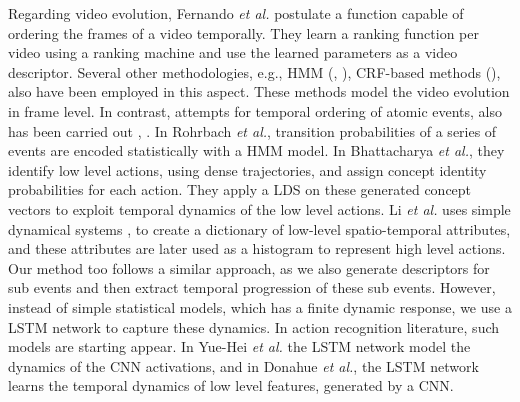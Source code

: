 Regarding video evolution, Fernando \textit{et al.}\cite{fernando2015modeling} postulate
a function capable of ordering the frames of a video
temporally. They learn a ranking function per video using a ranking machine and use the learned parameters as 
a video descriptor. Several other methodologies, e.g., HMM (\cite{wang2011hidden}, \cite{wu2014leveraging}), 
CRF-based methods (\cite{song2013action}), also have been employed in this aspect. These methods model the video evolution in frame 
level. In contrast, attempts for temporal ordering of atomic events, also has been carried out \cite{rohrbach2012script}, \cite{bhattacharya2014recognition}.
In Rohrbach \textit{et al.}\cite{rohrbach2012script}, transition probabilities of a series of events are encoded statistically with a HMM model. 
In Bhattacharya \textit{et al.}\cite{bhattacharya2014recognition}, they identify low level actions, using dense trajectories, and assign concept identity 
probabilities for each action. They apply a LDS on these generated concept vectors to exploit temporal 
dynamics of the low level actions. Li \textit{et al.}\cite{li2013recognizing} uses simple dynamical systems \cite{jackson1992perspectives},
\cite{kailath1974view} to create a dictionary of low-level spatio-temporal attributes, and these attributes 
are later used as a histogram to represent high level actions. Our method too follows a similar approach,
as we also generate descriptors for sub events and then extract temporal progression 
of these sub events. However, instead of simple statistical models, which has a finite dynamic response, 
we use a LSTM network \cite{hochreiter1997long} to capture these dynamics. In action recognition literature,
such models are starting appear. In Yue-Hei \textit{et al.}
\cite{yue2015beyond} the LSTM network model the dynamics of the CNN activations, and in Donahue \textit{et al.}\cite{donahue2015long},
the LSTM network learns the temporal dynamics of low level features, generated by a CNN. 

